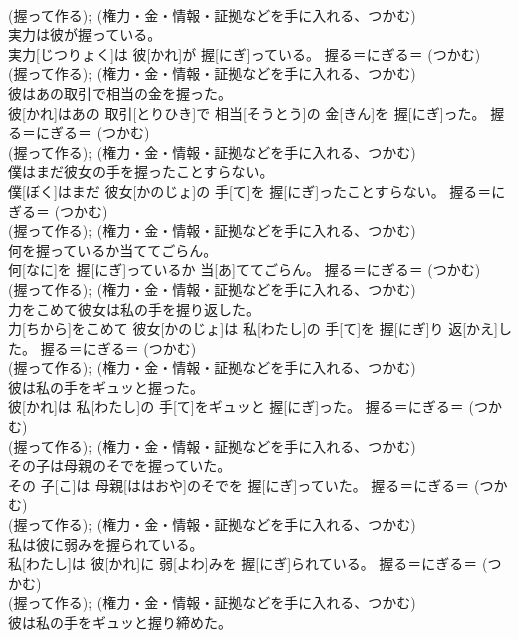 \documentclass[8pt]{extreport}
\begin{document}
\begin{CJK}{UTF8}{min}
{\\	(握って作る); (権力・金・情報・証拠などを手に入れる、つかむ) 
\\	実力は彼が握っている。	
\\	実力[じつりょく]は 彼[かれ]が 握[にぎ]っている。	握る＝にぎる＝ (つかむ) 
\\	(握って作る); (権力・金・情報・証拠などを手に入れる、つかむ) 
\\	彼はあの取引で相当の金を握った。	
\\	彼[かれ]はあの 取引[とりひき]で 相当[そうとう]の 金[きん]を 握[にぎ]った。	握る＝にぎる＝ (つかむ) 
\\	(握って作る); (権力・金・情報・証拠などを手に入れる、つかむ) 
\\	僕はまだ彼女の手を握ったことすらない。	
\\	僕[ぼく]はまだ 彼女[かのじょ]の 手[て]を 握[にぎ]ったことすらない。	握る＝にぎる＝ (つかむ) 
\\	(握って作る); (権力・金・情報・証拠などを手に入れる、つかむ) 
\\	何を握っているか当ててごらん。	
\\	何[なに]を 握[にぎ]っているか 当[あ]ててごらん。	握る＝にぎる＝ (つかむ) 
\\	(握って作る); (権力・金・情報・証拠などを手に入れる、つかむ) 
\\	力をこめて彼女は私の手を握り返した。	
\\	力[ちから]をこめて 彼女[かのじょ]は 私[わたし]の 手[て]を 握[にぎ]り 返[かえ]した。	握る＝にぎる＝ (つかむ) 
\\	(握って作る); (権力・金・情報・証拠などを手に入れる、つかむ) 
\\	彼は私の手をギュッと握った。	
\\	彼[かれ]は 私[わたし]の 手[て]をギュッと 握[にぎ]った。	握る＝にぎる＝ (つかむ) 
\\	(握って作る); (権力・金・情報・証拠などを手に入れる、つかむ) 
\\	その子は母親のそでを握っていた。	
\\	その 子[こ]は 母親[ははおや]のそでを 握[にぎ]っていた。	握る＝にぎる＝ (つかむ) 
\\	(握って作る); (権力・金・情報・証拠などを手に入れる、つかむ) 
\\	私は彼に弱みを握られている。	
\\	私[わたし]は 彼[かれ]に 弱[よわ]みを 握[にぎ]られている。	握る＝にぎる＝ (つかむ) 
\\	(握って作る); (権力・金・情報・証拠などを手に入れる、つかむ) 
\\	彼は私の手をギュッと握り締めた。	
}
\end{CJK}
\end{document}
